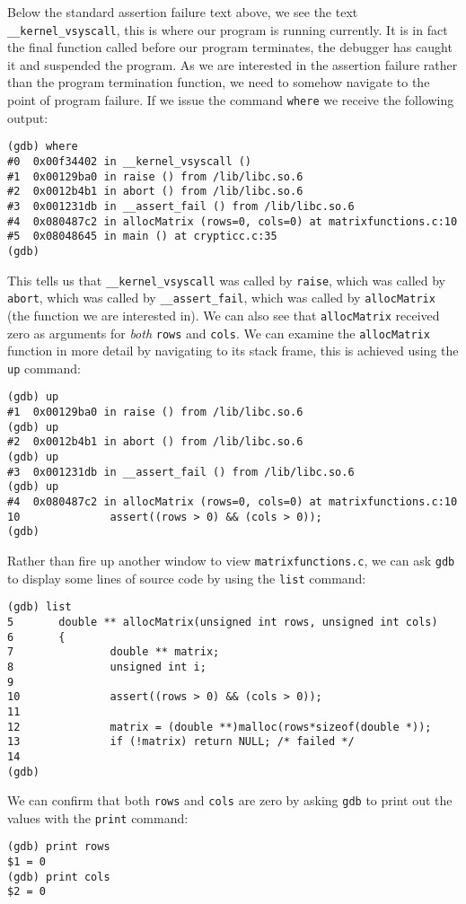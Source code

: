 \documentclass[a4paper,12pt]{article}
\begin{document}
Below the standard assertion failure text above, we see the text \verb|__kernel_vsyscall|, this is where our program is running currently. It is in fact the final function called before our program terminates, the debugger has caught it and suspended the program. As we are interested in the assertion failure rather than the
program termination function, we need to somehow navigate to the point of program failure. If we issue the command {\tt where} we receive the following output:
\begin{verbatim}
(gdb) where
#0  0x00f34402 in __kernel_vsyscall ()
#1  0x00129ba0 in raise () from /lib/libc.so.6
#2  0x0012b4b1 in abort () from /lib/libc.so.6
#3  0x001231db in __assert_fail () from /lib/libc.so.6
#4  0x080487c2 in allocMatrix (rows=0, cols=0) at matrixfunctions.c:10
#5  0x08048645 in main () at crypticc.c:35
(gdb) 
\end{verbatim}
This tells us that \verb|__kernel_vsyscall| was called by \verb|raise|, which was called by \verb|abort|, which was called by \verb|__assert_fail|, which was called by \verb|allocMatrix| (the function we are interested in). We can also see that \verb|allocMatrix| received zero as arguments for \emph{both} {\tt rows} and {\tt cols}. We can examine the \verb|allocMatrix| function in more detail by navigating to its stack frame, this is achieved using the {\tt up} command:
\begin{verbatim}
(gdb) up
#1  0x00129ba0 in raise () from /lib/libc.so.6
(gdb) up
#2  0x0012b4b1 in abort () from /lib/libc.so.6
(gdb) up
#3  0x001231db in __assert_fail () from /lib/libc.so.6
(gdb) up
#4  0x080487c2 in allocMatrix (rows=0, cols=0) at matrixfunctions.c:10
10              assert((rows > 0) && (cols > 0));
(gdb)
\end{verbatim}
Rather than fire up another window to view {\tt matrixfunctions.c}, we can ask {\tt gdb} to display some lines of source code by using the {\tt list} command:
\begin{verbatim}
(gdb) list
5       double ** allocMatrix(unsigned int rows, unsigned int cols)
6       {
7               double ** matrix;
8               unsigned int i;
9
10              assert((rows > 0) && (cols > 0));
11
12              matrix = (double **)malloc(rows*sizeof(double *));
13              if (!matrix) return NULL; /* failed */
14
(gdb) 
\end{verbatim}
We can confirm that both {\tt rows} and {\tt cols} are zero by asking {\tt gdb} to print out the values with the {\tt print} command:
\begin{verbatim}
(gdb) print rows
$1 = 0
(gdb) print cols
$2 = 0
\end{verbatim}
\end{document}
